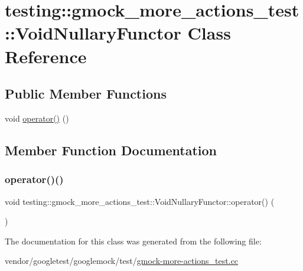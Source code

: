 \hypertarget{classtesting_1_1gmock__more__actions__test_1_1_void_nullary_functor}{}\section{testing\+:\+:gmock\+\_\+more\+\_\+actions\+\_\+test\+:\+:Void\+Nullary\+Functor Class Reference}
\label{classtesting_1_1gmock__more__actions__test_1_1_void_nullary_functor}
\subsection*{Public Member Functions}
\begin{DoxyCompactItemize}
\item 
void \hyperlink{classtesting_1_1gmock__more__actions__test_1_1_void_nullary_functor_a3b71273472780abc47927c57af209204}{operator()} ()
\end{DoxyCompactItemize}


\subsection{Member Function Documentation}
\mbox{\label{classtesting_1_1gmock__more__actions__test_1_1_void_nullary_functor_a3b71273472780abc47927c57af209204}} 
\subsubsection{\texorpdfstring{operator()()}{operator()()}}
{\footnotesize\ttfamily void testing\+::gmock\+\_\+more\+\_\+actions\+\_\+test\+::\+Void\+Nullary\+Functor\+::operator() (\begin{DoxyParamCaption}{ }\end{DoxyParamCaption})\hspace{0.3cm}{\ttfamily [inline]}}



The documentation for this class was generated from the following file\+:\begin{DoxyCompactItemize}
\item 
vendor/googletest/googlemock/test/\hyperlink{gmock-more-actions__test_8cc}{gmock-\/more-\/actions\+\_\+test.\+cc}\end{DoxyCompactItemize}
